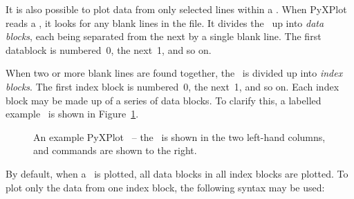 It is also possible to plot data from only selected lines within a \datafile.
When PyXPlot reads a \datafile, it looks for any blank lines in the file. It
divides the \datafile\ up into {\it data blocks}, each being separated from the
next by a single blank line. The first datablock is numbered~0, the next~1, and
so on.  

When two or more blank lines are found together, the \datafile\ is divided up
into {\it index blocks}. The first index block is numbered~0, the next~1, and
so on. Each index block may be made up of a series of data blocks. To clarify
this, a labelled example \datafile\ is shown in
Figure~\ref{fig:sample_datafile}.

\begin{figure}
\caption{An example PyXPlot \datafile\ -- the \datafile\ is shown in the two left-hand columns, and commands are shown to the right.}
\label{fig:sample_datafile}
\end{figure}

By default, when a \datafile\ is plotted, all data blocks in all index blocks are
plotted. To plot only the data from one index block, the following syntax may
be used:

